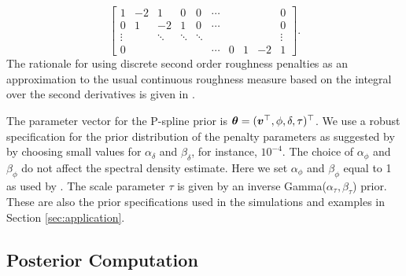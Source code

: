 \documentclass[twocolumn,final]{svjour3}
\newcommand{\bm}[1]{\mbox{\boldmath $#1$}}
\begin{document}
\begin{equation}\label{eq:D2}
\begin{bmatrix}
1 & -2 &  1 & 0 & 0 & \cdots & & & & 0 \\
0 & 1  & -2 & 1 & 0 & \cdots & & & & 0 \\
\vdots & & \ddots & \ddots & \ddots &&&&& \vdots \\
0 & &&&& \cdots & 0 & 1 & -2 & 1 
\end{bmatrix}.
\end{equation}
The rationale for using discrete second order roughness penalties as an approximation to the usual continuous roughness measure based on the integral over the second derivatives is given
in \cite{Eilers:1996}.

The parameter vector for the P-spline prior is $\bm{\theta} = (\bm{v}^\top, \phi, \delta, \tau)^\top$.
We use a robust specification for the  prior distribution of the penalty parameters as suggested by \cite{Jullion:2007} by choosing small values for $\alpha_{\delta}$ and $\beta_{\delta}$, for instance, $10^{-4}$. The  choice of $\alpha_{\phi}$ and $\beta_{\phi}$ do not affect the spectral density estimate. Here we set $\alpha_{\phi}$ and $\beta_{\phi}$ equal to 1 as used by \cite{Bremhorst:2016}. The scale parameter $\tau$ is given by an inverse Gamma($\alpha_{\tau},\beta_{\tau}$) prior.  These are also the prior specifications used in the simulations and examples in Section \ref{sec:application}.




\subsection*{Posterior Computation}
\end{document}
